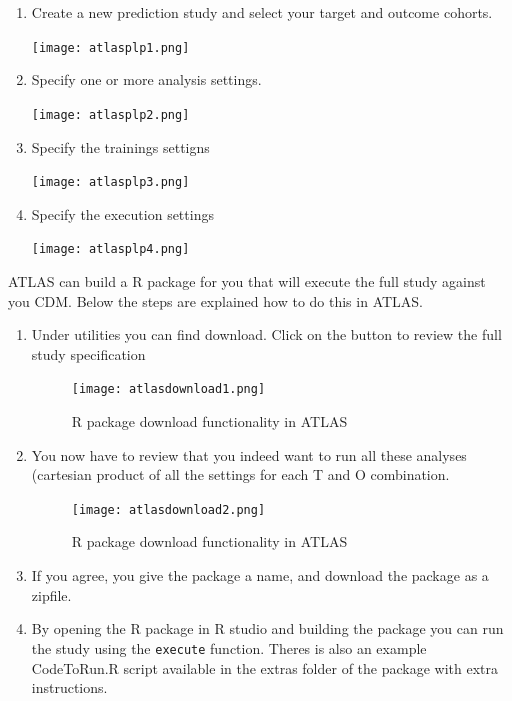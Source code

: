 \documentclass[
]{article}
\begin{document}
\begin{enumerate}
\def\labelenumi{\arabic{enumi})}
\item
  Create a new prediction study and select your target and outcome
  cohorts.

  \texttt{[image: atlasplp1.png]}
\item
  Specify one or more analysis settings.

  \texttt{[image: atlasplp2.png]}

  \newpage
\item
  Specify the trainings settigns

  \texttt{[image: atlasplp3.png]}
\item
  Specify the execution settings

  \texttt{[image: atlasplp4.png]}
\end{enumerate}

\newpage

ATLAS can build a R package for you that will execute the full study
against you CDM. Below the steps are explained how to do this in ATLAS.

\begin{enumerate}
\def\labelenumi{\arabic{enumi})}
\item
  Under utilities you can find download. Click on the button to review
  the full study specification

  \begin{figure}
  \centering
  \texttt{[image: atlasdownload1.png]}
  \caption{R package download functionality in ATLAS}
  \end{figure}
\item
  You now have to review that you indeed want to run all these analyses
  (cartesian product of all the settings for each T and O combination.

  \begin{figure}
  \centering
  \texttt{[image: atlasdownload2.png]}
  \caption{R package download functionality in ATLAS}
  \end{figure}
\item
  If you agree, you give the package a name, and download the package as
  a zipfile.
\item
  By opening the R package in R studio and building the package you can
  run the study using the \texttt{execute} function. Theres is also an
  example CodeToRun.R script available in the extras folder of the
  package with extra instructions.
\end{enumerate}
\end{document}
